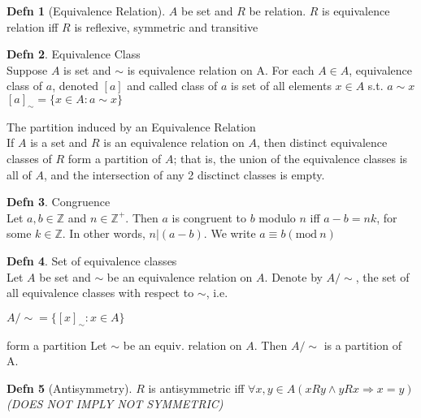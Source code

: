 \documentclass[a4paper]{article}
\theoremstyle{definition}
\newtheorem*{defn}{Defn}
\newenvironment{theorem}[1]
  {\renewcommand\theinnertheorem{#1}\innertheorem}
  {\endinnertheorem}
\begin{document}
\begin{defn}[Equivalence Relation]
  $A$ be set and $R$ be relation. $R$ is equivalence relation iff $R$ is reflexive, symmetric and transitive
\end{defn}

\begin{defn} Equivalence Class\\
  Suppose $A$ is set and $\sim$ is equivalence relation on A. For each $A \in A$, equivalence class of $a$, denoted $[a]$ and called class of $a$ is set of all elements $x \in A$ s.t. $a\sim x$\\
  $[a]_{\sim} = \{x \in A: a \sim x \}$
\end{defn}

\begin{theorem}{8.3.4} The partition induced by an Equivalence Relation\\
  If $A$ is a set and $R$ is an equivalence relation on $A$, then distinct equivalence classes of $R$ form a partition of $A$; that is, the union of the equivalence classes is all of $A$, and the intersection of any 2 disctinct classes is empty.
\end{theorem}

\begin{defn} Congruence\\
  Let $a, b \in \mathbb{Z}$ and $n \in \mathbb{Z}^+$. Then $a$ is congruent to $b$ modulo $n$ iff $a - b = nk$, for some $k \in \mathbb{Z}$. In other words, $n | (a - b)$. We write $a \equiv b (\text{mod}\ n)$
\end{defn}

\begin{defn} Set of equivalence classes\\
  Let $A$ be set and $\sim$ be an equivalence relation on $A$. Denote by $A/\sim$, the set of all equivalence classes with respect to $\sim$, i.e.

  $A/\sim = \{[x]_\sim: x \in A\}$
\end{defn}

\begin{theorem}{Equivalence Classes} form a partition
  Let $\sim$ be an equiv. relation on $A$. Then $A/\sim$ is a partition of A.
\end{theorem}

\begin{defn}[Antisymmetry]
  $R$ is antisymmetric iff $\forall x, y \in A(xRy \land yRx \Rightarrow x = y)$ \textit{(DOES NOT IMPLY NOT SYMMETRIC)}
\end{defn}
\end{document}
